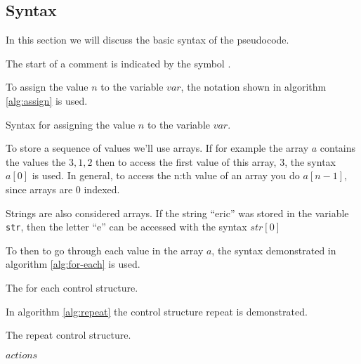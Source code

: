 \begin{Exercise}[]

\end{Exercise}


\subsection{Syntax}

In this section we will discuss the basic syntax of the pseudocode.

The start of a comment is indicated by the symbol \commentsymbol.

To assign the value $n$ to the variable $var$, the notation shown in
algorithm \ref{alg:assign} is used.



\begin{algorithm}[H]
  \caption{Syntax for assigning the value $n$ to the variable $var$.}
  \label{alg:assign}
  \begin{algorithmic}[1]
  \end{algorithmic}
\end{algorithm}

To store a sequence of values we'll use arrays. If for example the
array $a$ contains the values the $3,1,2$ then to access the first
value of this array, $3$, the syntax $a[0]$ is used. In general, to
access the n:th value of an array you do $a[n-1]$, since arrays are 0
indexed.

Strings are also considered arrays. If the string ``eric'' was
stored in the variable \texttt{str}, then the letter ``e'' can be
accessed with the syntax $str[0]$

To then to go through each value in the array $a$, the syntax
demonstrated in algorithm \ref{alg:for-each} is used.

\begin{algorithm}[H]
  \caption{The for each control structure.}
  \label{alg:for-each}
  \begin{algorithmic}[1]
    \EndForEach
  \end{algorithmic}
\end{algorithm}

In algorithm \ref{alg:repeat} the control structure repeat is
demonstrated.

\begin{algorithm}[H]
  \caption{The repeat control structure.}
  \label{alg:repeat}
  \begin{algorithmic}[1]
    \State $actions$ 
    \EndRepeatn
  \end{algorithmic}
\end{algorithm}

